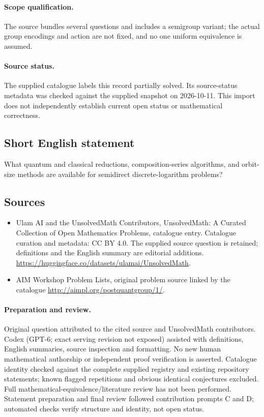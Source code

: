 \documentclass[11pt]{article}
\begin{document}
\paragraph{Scope qualification.}
The source bundles several questions and includes a semigroup variant; the actual group encodings and action are not fixed, and no one uniform equivalence is assumed.
\paragraph{Source status.}
The supplied catalogue labels this record partially solved. Its source-status metadata was checked against the supplied snapshot on 2026-10-11. This import does not independently establish current open status or mathematical correctness.
\subsection{Short English statement}
What quantum and classical reductions, composition-series algorithms, and orbit-size methods are available for semidirect discrete-logarithm problems?
\subsection{Sources}
\begin{itemize}
\item[\hypertarget{source:statement:1}{S1}] Ulam AI and the UnsolvedMath Contributors, UnsolvedMath: A Curated Collection of Open Mathematics Problems, catalogue entry. Catalogue curation and metadata: CC BY 4.0. The supplied source question is retained; definitions and the English summary are editorial additions.
\url{https://huggingface.co/datasets/ulamai/UnsolvedMath}.
\item[\hypertarget{source:statement:2}{S2}] AIM Workshop Problem Lists, original problem source linked by the catalogue
\url{http://aimpl.org/postquantgroup/1/}.
\end{itemize}
\paragraph{Preparation and review.}
Original question attributed to the cited source and UnsolvedMath contributors. Codex (GPT-6; exact serving revision not exposed) assisted with definitions, English summaries, source inspection and formatting. No new human mathematical authorship or independent proof verification is asserted. Catalogue identity checked against the complete supplied registry and existing repository statements; known flagged repetitions and obvious identical conjectures excluded. Full mathematical-equivalence/literature review has not been performed. Statement preparation and final review followed contribution prompts C and D; automated checks verify structure and identity, not open status.
\label{end:statement}
\end{document}
